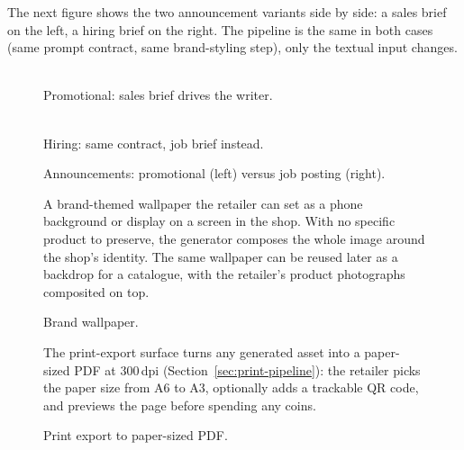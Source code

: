 The next figure shows the two announcement variants side by side: a sales brief on the left, a hiring brief on the right. The pipeline is the same in both cases (same prompt contract, same brand-styling step), only the textual input changes.

\begin{figure}[H]
\centering
\begin{minipage}[t]{0.47\textwidth}
\centering
{}\\[2pt]
{\small Promotional: sales brief drives the writer.}
\end{minipage}\hfill
\begin{minipage}[t]{0.47\textwidth}
\centering
{}\\[2pt]
{\small Hiring: same contract, job brief instead.}
\end{minipage}
\caption{Announcements: promotional (left) versus job posting (right).}
\label{fig:result-announcements}
\end{figure}

\begin{figure}[H]
\begin{minipage}[c]{0.52\textwidth}
\raggedright
A brand-themed wallpaper the retailer can set as a phone background or display on a screen in the shop. With no specific product to preserve, the generator composes the whole image around the shop's identity. The same wallpaper can be reused later as a backdrop for a catalogue, with the retailer's product photographs composited on top.
\end{minipage}\hfill
\begin{minipage}[c]{0.42\textwidth}
\centering
{}
\end{minipage}
\caption{Brand wallpaper.}
\label{fig:result-wallpaper}
\end{figure}

\begin{figure}[H]
\begin{minipage}[c]{0.52\textwidth}
\raggedright
The print-export surface turns any generated asset into a paper-sized PDF at $300\,$dpi (Section~\ref{sec:print-pipeline}): the retailer picks the paper size from A6 to A3, optionally adds a trackable QR code, and previews the page before spending any coins.
\end{minipage}\hfill
\begin{minipage}[c]{0.42\textwidth}
\centering
{}
\end{minipage}
\caption{Print export to paper-sized PDF.}
\label{fig:result-print}
\end{figure}

